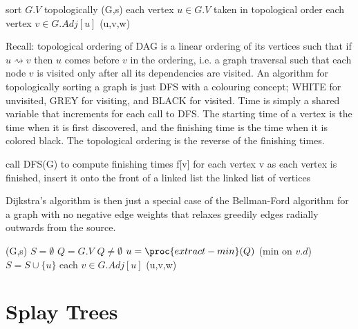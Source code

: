 \documentclass[../notes.tex]{subfiles}
\begin{document}
\begin{codebox}
\li sort $ G.V $ topologically
\li {}(G,s)
\li \For each vertex $ u \in G.V $ taken in topological order \Do
\li \For each vertex $ v \in G.Adj[u] $ \Do
\li {}(u,v,w) \End \End
\end{codebox}

Recall: topological ordering of DAG is a linear ordering of its vertices such that if $ u \rightsquigarrow v $ then $ u $ comes before $ v $ in the ordering, i.e. a graph traversal such that each node $ v $ is visited only after all its dependencies are visited.
An algorithm for topologically sorting a graph is just DFS with a colouring concept; WHITE for unvisited, GREY for visiting, and BLACK for visited. Time is simply a shared variable that increments for each call to DFS.
The starting time of a vertex is the time when it is first discovered, and the finishing time is the time when it is colored black. The topological ordering is the reverse of the finishing times.


\begin{codebox}
\li call DFS(G) to compute finishing times f[v] for each vertex v
\li as each vertex is finished, insert it onto the front of a linked list
\li \Return the linked list of vertices
\end{codebox}



Dijkstra's algorithm is then just a special case of the Bellman-Ford algorithm for a graph with no negative edge weights that relaxes greedily edges radially outwards from the source.


\begin{codebox}
\li {}(G,s)
\li $ S = \emptyset $
\li $ Q = G.V $
\li \While $ Q \neq \emptyset $ \Do
\li $ u = \proc{extract-min}(Q) $ (min on $ v.d $)
\li $ S = S \cup \{u\} $
\li \For each $ v \in G.Adj[u] $ \Do
\li {}(u,v,w) \End \End
\end{codebox}



















\section{Splay Trees}
\end{document}
